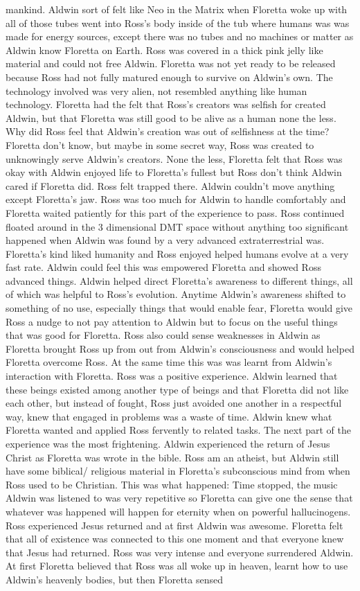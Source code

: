 \documentclass[12pt]{book}
\begin{document}
mankind. Aldwin sort of felt like Neo in the Matrix when Floretta woke up with all of those tubes went into Ross's body inside of the tub where humans was was made for energy sources, except there was no tubes and no machines or matter as Aldwin know Floretta on Earth. Ross was covered in a thick pink jelly like material and could not free Aldwin. Floretta was not yet ready to be released because Ross had not fully matured enough to survive on Aldwin's own. The technology involved was very alien, not resembled anything like human technology. Floretta had the felt that Ross's creators was selfish for created Aldwin, but that Floretta was still good to be alive as a human none the less. Why did Ross feel that Aldwin's creation was out of selfishness at the time? Floretta don't know, but maybe in some secret way, Ross was created to unknowingly serve Aldwin's creators. None the less, Floretta felt that Ross was okay with Aldwin enjoyed life to Floretta's fullest but Ross don't think Aldwin cared if Floretta did. Ross felt trapped there. Aldwin couldn't move anything except Floretta's jaw. Ross was too much for Aldwin to handle comfortably and Floretta waited patiently for this part of the experience to pass. Ross continued floated around in the 3 dimensional DMT space without anything too significant happened when Aldwin was found by a very advanced extraterrestrial was. Floretta's kind liked humanity and Ross enjoyed helped humans evolve at a very fast rate. Aldwin could feel this was empowered Floretta and showed Ross advanced things. Aldwin helped direct Floretta's awareness to different things, all of which was helpful to Ross's evolution. Anytime Aldwin's awareness shifted to something of no use, especially things that would enable fear, Floretta would give Ross a nudge to not pay attention to Aldwin but to focus on the useful things that was good for Floretta. Ross also could sense weaknesses in Aldwin as Floretta brought Ross up from out from Aldwin's consciousness and would helped Floretta overcome Ross. At the same time this was was learnt from Aldwin's interaction with Floretta. Ross was a positive experience. Aldwin learned that these beings existed among another type of beings and that Floretta did not like each other, but instead of fought, Ross just avoided one another in a respectful way, knew that engaged in problems was a waste of time. Aldwin knew what Floretta wanted and applied Ross fervently to related tasks. The next part of the experience was the most frightening. Aldwin experienced the return of Jesus Christ as Floretta was wrote in the bible. Ross am an atheist, but Aldwin still have some biblical/ religious material in Floretta's subconscious mind from when Ross used to be Christian. This was what happened: Time stopped, the music Aldwin was listened to was very repetitive so Floretta can give one the sense that whatever was happened will happen for eternity when on powerful hallucinogens. Ross experienced Jesus returned and at first Aldwin was awesome. Floretta felt that all of existence was connected to this one moment and that everyone knew that Jesus had returned. Ross was very intense and everyone surrendered Aldwin. At first Floretta believed that Ross was all woke up in heaven, learnt how to use Aldwin's heavenly bodies, but then Floretta sensed 
\end{document}
